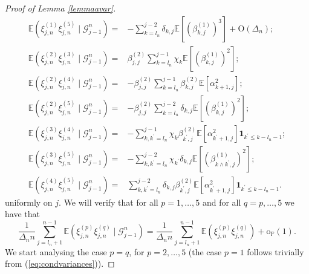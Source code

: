 \documentclass{article}
\theoremstyle{plain}
\theoremstyle{definition}
\theoremstyle{remark}
\begin{document}
\begin{appendix}
\begin{proof}[Proof of Lemma \ref{lemmaavar}]
\begin{equation}
\begin{aligned}
			\mathbb{E}(\xi_{j,n}^{(1)}\xi_{j,n}^{(5)}\mid\mathscr{G}_{j-1}^{n})= &-\sum_{k=l_{n}}^{j-2}\delta_{k,j}\mathbb{E}[(\beta_{k,j}^{(1)})^{3}] +\mathrm{O}(\Delta_n);\\
			\mathbb{E}(\xi_{j,n}^{(2)}\xi_{j,n}^{(3)}\mid\mathscr{G}_{j-1}^{n})= & \beta_{j,j}^{(2)}\sum_{k=l_{n}}^{j-1}\chi_{k}\mathbb{E}[(\beta_{k,j}^{(1)})^{2}];\\
			\mathbb{E}(\xi_{j,n}^{(2)}\xi_{j,n}^{(4)}\mid\mathscr{G}_{j-1}^{n})= & -\beta_{j,j}^{(2)}\sum_{k=l_{n}}^{j-1}\beta_{k,j}^{(2)}\mathbb{E}[\alpha_{k+1,j}^{2}];\\
			\mathbb{E}(\xi_{j,n}^{(2)}\xi_{j,n}^{(5)}\mid\mathscr{G}_{j-1}^{n})= & -\beta_{j,j}^{(2)}\sum_{k=l_{n}}^{j-2}\delta_{k,j}\mathbb{E}[(\beta_{k,j}^{(1)})^{2}];\\
			\mathbb{E}(\xi_{j,n}^{(3)}\xi_{j,n}^{(4)}\mid\mathscr{G}_{j-1}^{n})= & -\sum_{k,k^{\prime}=l_{n}}^{j-1}\chi_{k}\beta_{k^{\prime},j}^{(2)}\mathbb{E}[\alpha_{k^{\prime}+1,j}^{2}]\mathbf{1}_{k^{\prime}\leq k-l_{n}-1};\\
			\mathbb{E}(\xi_{j,n}^{(3)}\xi_{j,n}^{(5)}\mid\mathscr{G}_{j-1}^{n})= & -\sum_{k,k^{\prime}=l_{n}}^{j-2}\chi_{k^{\prime}}\delta_{k,j}\mathbb{E}[(\beta_{k\land k^{\prime},j}^{(1)})^{2}];\\
			\mathbb{E}(\xi_{j,n}^{(4)}\xi_{j,n}^{(5)}\mid\mathscr{G}_{j-1}^{n})= & \sum_{k,k^{\prime}=l_{n}}^{j-2}\delta_{k,j}\beta_{k^{\prime},j}^{(2)}\mathbb{E}[\alpha_{k^{\prime}+1,j}^{2}]\mathbf{1}_{k^{\prime}\leq k-l_{n}-1}.
		\end{aligned}
		\label{eq:condcovar}
	\end{equation}
	uniformly on $j$. We will verify that for all $p=1,\ldots,5$ and for all $q=p,\ldots,5$
	we have that 
	\begin{equation}
		\frac{1}{\Delta_{n}n}\sum_{j=l_{n}+1}^{n-1}\mathbb{E}(\xi_{j,n}^{(p)}\xi_{j,n}^{(q)}\mid\mathscr{G}_{j-1}^{n})=\frac{1}{\Delta_{n}n}\sum_{j=l_{n}+1}^{n-1}\mathbb{E}(\xi_{j,n}^{(p)}\xi_{j,n}^{(q)})+\mathrm{o}_{\mathbb{P}}(1).\label{eq:lemmaapproxxi}
	\end{equation}
	We start analysing the case $p=q$, for $p=2,\ldots,5$ (the case
	$p=1$ follows trivially from (\ref{eq:condvariances})).
	

\end{proof}
\end{appendix}
\end{document}
